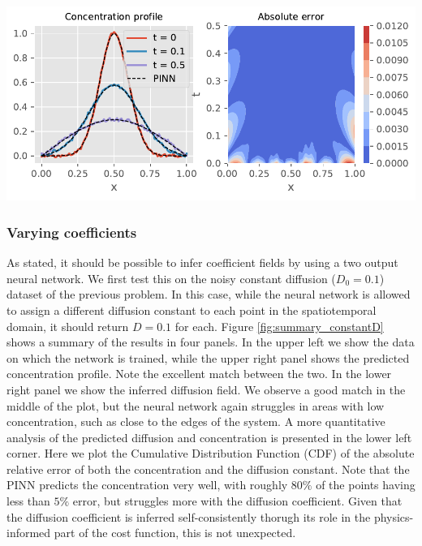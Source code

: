 \documentclass{Dissertate}
\let\origfigure\figure
\let\endorigfigure\endfigure
\renewenvironment{figure}[1][2] {
    \expandafter\origfigure\expandafter[H]
} {
    \endorigfigure
}
\begin{document}
\begin{figure}
\hypertarget{fig:error_constantD_noisy}{%
\centering
\includegraphics{source/figures/pdf/error_constantD_noisy.pdf}
\caption{\textbf{Left panel}: The original noisy concentration profile
at several times with the neural network inferred denoised version
superimposed. \textbf{Right panel}: The absolute error of neural network
with respect to the ground truth. Note that most of the error is located
at areas with low concentration.}\label{fig:error_constantD_noisy}
}
\end{figure}

\hypertarget{varying-coefficients}{%
\subsubsection{Varying coefficients}\label{varying-coefficients}}

As stated, it should be possible to infer coefficient fields by using a
two output neural network. We first test this on the noisy constant
diffusion (\(D_0=0.1\)) dataset of the previous problem. In this case,
while the neural network is allowed to assign a different diffusion
constant to each point in the spatiotemporal domain, it should return
\(D=0.1\) for each. Figure \ref{fig:summary_constantD} shows a
summary of the results in four panels. In the upper left we show the
data on which the network is trained, while the upper right panel shows
the predicted concentration profile. Note the excellent match between
the two. In the lower right panel we show the inferred diffusion field.
We observe a good match in the middle of the plot, but the neural
network again struggles in areas with low concentration, such as close
to the edges of the system. A more quantitative analysis of the
predicted diffusion and concentration is presented in the lower left
corner. Here we plot the Cumulative Distribution Function (CDF) of the
absolute relative error of both the concentration and the diffusion
constant. Note that the PINN predicts the concentration very well, with
roughly \(80\%\) of the points having less than \(5\%\) error, but
struggles more with the diffusion coefficient. Given that the diffusion
coefficient is inferred self-consistently thorugh its role in the
physics-informed part of the cost function, this is not unexpected.
\end{document}
